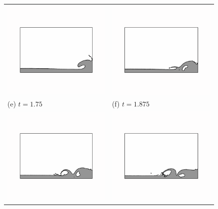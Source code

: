\begin{figure}[tbp]
\begin{center}
\begin{tabular}{ll}
\includegraphics[width=7cm, trim=2.5cm 4.5cm 2.5cm 4.5cm, clip=true]{examples_images/water_collapse/water_collapse_300.png} & \includegraphics[width=7cm, trim=2.5cm 4.5cm 2.5cm 4.5cm, clip=true]{examples_images/water_collapse/water_collapse_325.png} \\
(e) $t = 1.75$ & (f) $t = 1.875$ \\
\includegraphics[width=7cm, trim=2.5cm 4.5cm 2.5cm 4.5cm, clip=true]{examples_images/water_collapse/water_collapse_350.png} & \includegraphics[width=7cm, trim=2.5cm 4.5cm 2.5cm 4.5cm, clip=true]{examples_images/water_collapse/water_collapse_375.png} \\

\end{tabular}
\end{center}
\end{figure}
